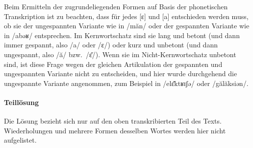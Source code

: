 Beim Ermitteln der zugrundeliegenden Formen auf Basis der phonetischen Transkription ist zu beachten, dass für jedes [ɛ] und [a] entschieden werden muss, ob sie der ungespannten Variante wie in /măn/ oder der gespannten Variante wie in /abəʁ/ entsprechen.
Im Kernwortschatz sind sie lang und betont (und dann immer gespannt, also /a/ oder /ɛ/) oder kurz und unbetont (und dann ungespannt, also /ă/ bzw.\ /ɛ̆/).
Wenn sie im Nicht-Kernwortschatz unbetont sind, ist diese Frage wegen der gleichen Artikulation der gespannten und ungespannten Variante nicht zu entscheiden, und hier wurde durchgehend die ungespannte Variante angenommen, zum Beispiel in /elɛ̆ktʁɪʃə/ oder /gălăksiən/.



\paragraph*{Teillösung}

Die Lösung bezieht sich nur auf den oben transkribierten Teil des Texts.
Wiederholungen und mehrere Formen desselben Wortes werden hier nicht aufgelistet.

